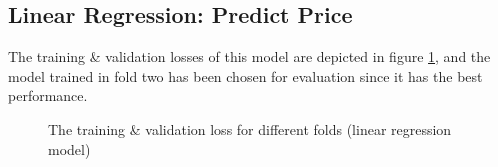 \documentclass[12pt,twoside]{report}
\begin{document}
\subsection{Linear Regression: Predict Price}
The training \& validation losses of this model are depicted in figure \ref{linear_regression_fold_5}, and the model trained in fold two has been chosen for evaluation since it has the best performance. 
\begin{figure}[h]
	\centering
	\hfill
	\hfill
	\hfil
	\hfil
	\caption{The training \& validation loss for different folds (linear regression model)}
	\label{linear_regression_fold_5}
\end{figure}
\end{document}
